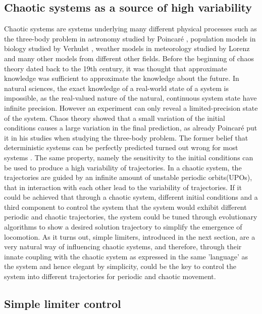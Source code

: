 \documentclass[main]{subfiles}
\begin{document}

\subsection{Chaotic systems as a source of high variability}

Chaotic systems are systems underlying many different physical processes such as the three-body problem in astronomy studied by Poincaré \cite{bib:Poincare1892}, population models in biology studied by Verhulst \cite{bib:Verhulst1838}, weather models in meteorology studied by Lorenz \cite{bib:Lorenz1963} and many other models from different other fields. Before the beginning of chaos theory dated back to the 19th century, it was thought that approximate knowledge was sufficient to approximate the knowledge about the future. In natural sciences, the exact knowledge of a real-world state of a system is impossible, as the real-valued nature of the natural, continuous system state have infinite precision. However an experiment can only reveal a limited-precision state of the system. Chaos theory showed that a small variation of the initial conditions causes a large variation in the final prediction, as already Poincaré put it in his studies when studying the three-body problem. The former belief that deterministic systems can be perfectly predicted turned out wrong for most systems \cite{bib:Motter2013}. The same property, namely the sensitivity to the initial conditions can be used to produce a high variability of trajectories. In a chaotic system, the trajectories are guided by an infinite amount of unstable periodic orbits(UPOs), that in interaction with each other lead to the variability of trajectories. If it could be achieved that through a chaotic system, different initial conditions and a third component to control the system that the system would exhibit different periodic and chaotic trajectories, the system could be tuned through evolutionary algorithms to show a desired solution trajectory to simplify the emergence of locomotion. As it turns out, simple limiters, introduced in the next section, are a very natural way of influencing chaotic systems, and therefore, through their innate coupling with the chaotic system as expressed in the same 'language' as the system and hence elegant by simplicity, could be the key to control the system into different trajectories for periodic and chaotic movement.

\subsection{Simple limiter control}

\lipsum[1]

\end{document}
